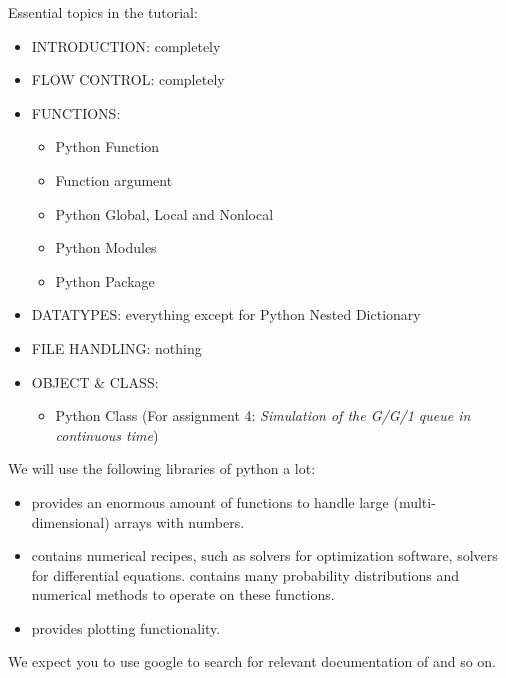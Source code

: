 Essential topics in the tutorial:
\begin{itemize}
\item INTRODUCTION: completely
\item FLOW CONTROL: completely
\item FUNCTIONS:
        \begin{itemize}
        \item Python Function
        \item Function argument
        \item Python Global, Local and Nonlocal
        \item Python Modules
        \item Python Package
        \end{itemize}
\item DATATYPES: everything except for Python Nested Dictionary
\item FILE HANDLING: nothing
\item OBJECT \& CLASS:
\begin{itemize}
\item Python Class (For assignment 4: \emph{Simulation of the G/G/1 queue in continuous time})
\end{itemize}
\end{itemize}

We will use the following libraries of python a lot:
\begin{itemize}
\item {}  provides an enormous amount of functions to handle large (multi-dimensional) arrays with numbers.
\item {} contains numerical recipes, such as solvers for optimization software, solvers for differential equations.  contains many probability distributions and numerical methods to operate on these functions.
\item {} provides plotting functionality.
\end{itemize}
We expect you to use google to search for relevant documentation of  and so on.

